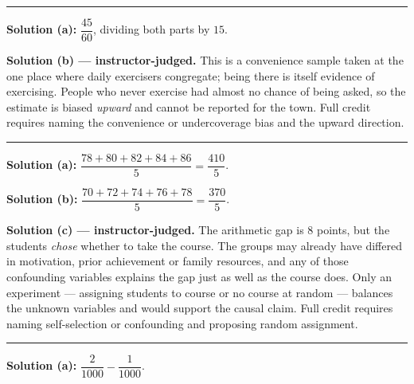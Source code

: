 \documentclass[12pt]{article}
\begin{document}
\vspace{0.15cm}\noindent\rule{\linewidth}{0.2pt}\vspace{0.15cm}


\textbf{Solution (a):} \quad $\dfrac{45}{60}$, dividing both parts by $15$. 

\textbf{Solution (b) --- instructor-judged.} \quad This is a convenience sample taken at the one
place where daily exercisers congregate; being there is itself evidence of exercising. People
who never exercise had almost no chance of being asked, so the estimate is biased \emph{upward}
and cannot be reported for the town. Full credit requires naming the convenience or
undercoverage bias and the upward direction.

\vspace{0.15cm}\noindent\rule{\linewidth}{0.2pt}\vspace{0.15cm}


\textbf{Solution (a):} \quad $\dfrac{78+80+82+84+86}{5} = \dfrac{410}{5}$. 

\textbf{Solution (b):} \quad $\dfrac{70+72+74+76+78}{5} = \dfrac{370}{5}$. 

\textbf{Solution (c) --- instructor-judged.} \quad The arithmetic gap is $8$ points, but the
students \emph{chose} whether to take the course. The groups may already have differed in
motivation, prior achievement or family resources, and any of those confounding variables
explains the gap just as well as the course does. Only an experiment --- assigning students to
course or no course at random --- balances the unknown variables and would support the causal
claim. Full credit requires naming self-selection or confounding and proposing random
assignment.

\vspace{0.15cm}\noindent\rule{\linewidth}{0.2pt}\vspace{0.15cm}


\textbf{Solution (a):} \quad $\dfrac{2}{1000} - \dfrac{1}{1000}$. 
\end{document}
